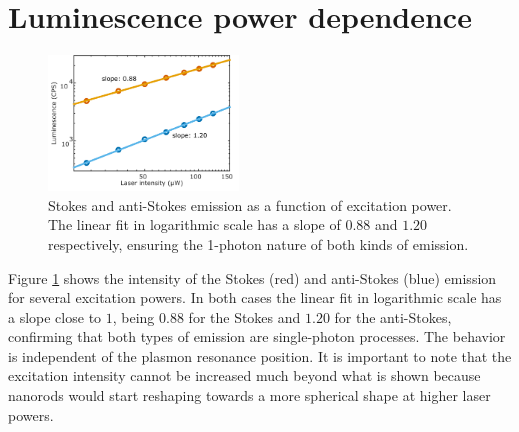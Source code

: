 \documentclass[journal=nalefd,manuscript=letter]{achemso}
\begin{document}
\section{Luminescence power dependence}
\begin{figure}[htp] \centering
\includegraphics[width=0.45\textwidth]{Figures/Supplementary/01_AS_S_in_Log/01_AS_S_in_Log.png}
\caption{Stokes and anti-Stokes emission as a function of excitation power. The
linear fit in logarithmic scale has a slope of $0.88$ and $1.20$ respectively,
ensuring the 1-photon nature of both kinds of emission.}
	\label{fig:Log_Plot}
\end{figure}

Figure \ref{fig:Log_Plot} shows the intensity of the Stokes (red) and
anti-Stokes (blue) emission for several excitation powers. In both cases the
linear fit in logarithmic scale has a slope close to $1$, being $0.88$ for the
Stokes and $1.20$ for the anti-Stokes, confirming that both types of emission
are single-photon processes. The behavior is independent of the plasmon
resonance position. It is important to note that the excitation intensity cannot
be increased much beyond what is shown because nanorods would start reshaping
towards a more spherical shape at higher laser powers.


\end{document}
